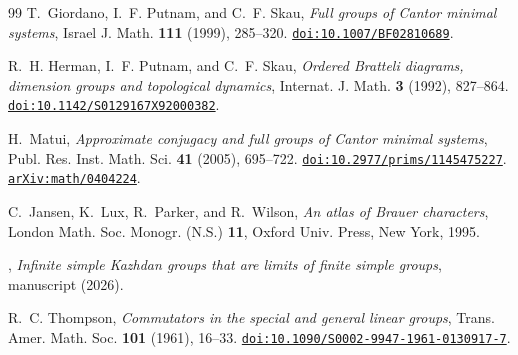 \documentclass[11pt]{amsart}
\theoremstyle{remark}
\newcommand{\doi}[1]{\href{https://doi.org/#1}{\nolinkurl{doi:#1}}}
\newcommand{\arxiv}[1]{\href{https://arxiv.org/abs/#1}{\nolinkurl{arXiv:#1}}}
\begin{document}
\begin{thebibliography}{99}
T.~Giordano, I.~F. Putnam, and C.~F. Skau,
\emph{Full groups of Cantor minimal systems},
Israel J. Math. \textbf{111} (1999), 285--320.
\doi{10.1007/BF02810689}.

R.~H. Herman, I.~F. Putnam, and C.~F. Skau, \emph{Ordered Bratteli
diagrams, dimension groups and topological dynamics}, Internat. J. Math.
\textbf{3} (1992), 827--864. \doi{10.1142/S0129167X92000382}.

H.~Matui, \emph{Approximate conjugacy and full groups of Cantor minimal
systems}, Publ. Res. Inst. Math. Sci. \textbf{41} (2005), 695--722.
\doi{10.2977/prims/1145475227}. \arxiv{math/0404224}.

C.~Jansen, K.~Lux, R.~Parker, and R.~Wilson, \emph{An atlas of Brauer
characters}, London Math. Soc. Monogr. (N.S.) \textbf{11}, Oxford Univ.
Press, New York, 1995.

\paperauthorname, \emph{Infinite simple Kazhdan groups that are limits of
finite simple groups}, manuscript (2026).

R.~C. Thompson, \emph{Commutators in the special and general linear
groups}, Trans. Amer. Math. Soc. \textbf{101} (1961), 16--33.
\doi{10.1090/S0002-9947-1961-0130917-7}.

\end{thebibliography}
\end{document}
